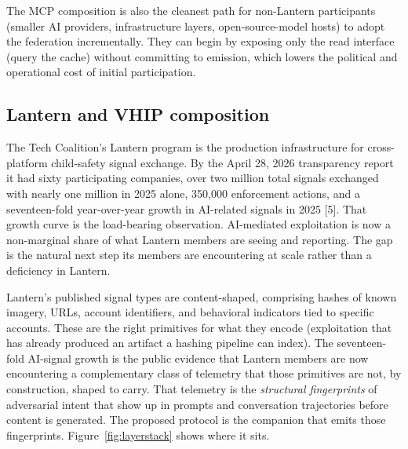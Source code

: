 \documentclass[11pt]{article}
\begin{document}
The MCP composition is also the cleanest path for non-Lantern participants (smaller AI providers, infrastructure layers, open-source-model hosts) to adopt the federation incrementally. They can begin by exposing only the read interface (query the cache) without committing to emission, which lowers the political and operational cost of initial participation.

\subsection{Lantern and VHIP composition}

The Tech Coalition's Lantern program is the production infrastructure for cross-platform child-safety signal exchange. By the April 28, 2026 transparency report it had sixty participating companies, over two million total signals exchanged with nearly one million in 2025 alone, 350{,}000 enforcement actions, and a seventeen-fold year-over-year growth in AI-related signals in 2025 [5]. That growth curve is the load-bearing observation. AI-mediated exploitation is now a non-marginal share of what Lantern members are seeing and reporting. The gap is the natural next step its members are encountering at scale rather than a deficiency in Lantern.

Lantern's published signal types are content-shaped, comprising hashes of known imagery, URLs, account identifiers, and behavioral indicators tied to specific accounts. These are the right primitives for what they encode (exploitation that has already produced an artifact a hashing pipeline can index). The seventeen-fold AI-signal growth is the public evidence that Lantern members are now encountering a complementary class of telemetry that those primitives are not, by construction, shaped to carry. That telemetry is the \emph{structural fingerprints} of adversarial intent that show up in prompts and conversation trajectories before content is generated. The proposed protocol is the companion that emits those fingerprints. Figure~\ref{fig:layerstack} shows where it sits.
\end{document}

